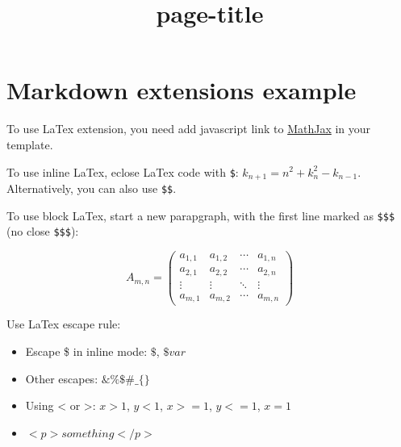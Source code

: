 \documentclass{article}
\title{{page-title}}
\date{}
\begin{document}
\maketitle

\section*{Markdown extensions example}



To use LaTex extension, you need add javascript
link to \href{http://www.mathjax.org/}{MathJax} in
your template.


To use inline LaTex, eclose LaTex code with \texttt{\$}:
$k_{n+1} = n^2 + k_n^2 - k_{n-1}$. Alternatively,
you can also use \texttt{\$\$}.


To use block LaTex, start a new parapgraph, with
the first line marked as \texttt{\$\$\$} (no close \texttt{\$\$\$}):


\begin{equation}
A_{m,n} =
 \begin{pmatrix}
  a_{1,1} & a_{1,2} & \cdots & a_{1,n} \\
  a_{2,1} & a_{2,2} & \cdots & a_{2,n} \\
  \vdots  & \vdots  & \ddots & \vdots  \\
  a_{m,1} & a_{m,2} & \cdots & a_{m,n}
 \end{pmatrix}
\end{equation}




Use LaTex escape rule:
\begin{itemize}
\item Escape \$ in inline mode: $\$$, $\$var$

\item Other escapes: $\& \% \$ \# \_ \{ \}$

\item Using < or >: $x > 1$, $y < 1$, $x >= 1$,
$y <= 1$, $x = 1$

\item $<p>something</p>$

\end{itemize}
\end{document}
